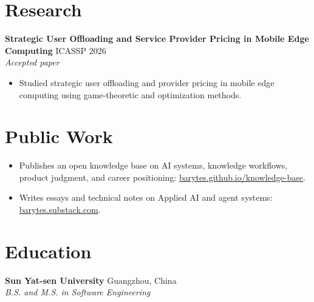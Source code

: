 \documentclass[10pt,letterpaper]{article}
\newcommand{\resumeItem}[1]{\item #1}
\newcommand{\resumeSubheading}[4]{
  \textbf{#1} \hfill #2 \\
  \textit{#3} \hfill \textit{#4}
}
\begin{document}
\section{Research}

\resumeSubheading{Strategic User Offloading and Service Provider Pricing in Mobile Edge Computing}{ICASSP 2026}
{Accepted paper}{}
\begin{itemize}
  \resumeItem{Studied strategic user offloading and provider pricing in mobile edge computing using game-theoretic and optimization methods.}
\end{itemize}

\section{Public Work}
\begin{itemize}
  \resumeItem{Publishes an open knowledge base on AI systems, knowledge workflows, product judgment, and career positioning: \href{https://barytes.github.io/knowledge-base}{barytes.github.io/knowledge-base}.}
  \resumeItem{Writes essays and technical notes on Applied AI and agent systems: \href{https://barytes.substack.com}{barytes.substack.com}.}
\end{itemize}

\section{Education}

\resumeSubheading{Sun Yat-sen University}{Guangzhou, China}
{B.S. and M.S. in Software Engineering}{}
\end{document}
